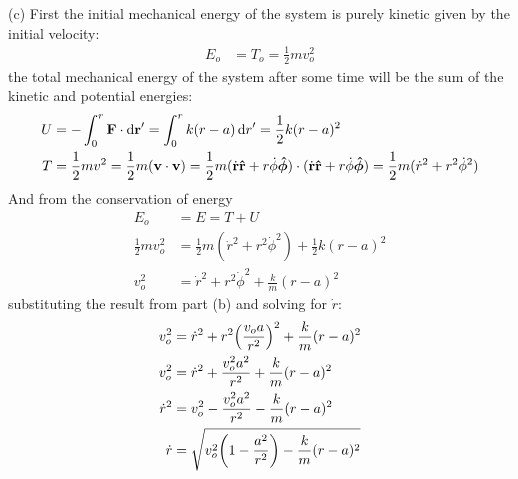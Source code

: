 \documentclass[../hw.tex]{subfiles}
\begin{document}
(c) First the initial mechanical energy of the system is purely kinetic given by the initial velocity:
\begin{align*}
  E_o &= T_o = \frac{1}{2} m v_o^2
\end{align*}
the total mechanical energy of the system after some time will be the sum of the kinetic and potential
energies:
\begin{align*}
  U &= - \int_0^r \vb{F} \cdot \dd{\vb{r}}' = \int_0^r k(r - a) \dd{r}' = \frac{1}{2} k (r - a)^2 \\
  T &= \frac{1}{2} m v^2 = \frac{1}{2} m (\vb{v} \cdot \vb{v})
    = \frac{1}{2} m (\dot{\vb r} \vu{r} + r \dot\phi \vu*{\phi})
      \cdot (\dot{\vb r} \vu{r} + r \dot\phi \vu*{\phi}) 
    = \frac{1}{2} m (\dot r^2 + r^2 \dot\phi^2)
\end{align*}
And from the conservation of energy
\begin{align*}
  E_o &= E = T + U \\
  \frac{1}{2} m v_o^2 &= \frac{1}{2} m (\dot r^2 + r^2 \dot\phi^2) + \frac{1}{2} k (r - a)^2 \\
  v_o^2 &= \dot r^2 + r^2 \dot\phi^2 + \frac{k}{m} (r - a)^2
\end{align*}
substituting the result from part (b) and solving for $\dot r$:
\begin{align*}
  v_o^2 &= \dot r^2 + r^2 \qt(\frac{v_o a}{r^2})^2 + \frac{k}{m} (r - a)^2 \\
  v_o^2 &= \dot r^2 + \frac{v_o^2 a^2}{r^2} + \frac{k}{m} (r - a)^2 \\
  \dot r^2 &= v_o^2 - \frac{v_o^2 a^2}{r^2} - \frac{k}{m} (r - a)^2 \\
  \dot r &= \sqrt{v_o^2 \qt(1 - \frac{a^2}{r^2}) - \frac{k}{m} (r - a)^2}
\end{align*}
\end{document}
